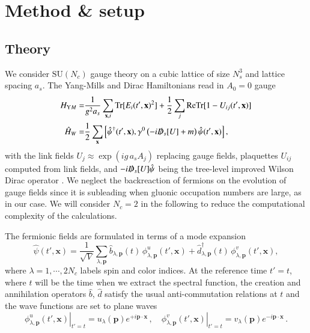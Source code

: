 \documentclass[]{webofc}
\def\be{\begin{equation}}
\def\ee{\end{equation}}
\newcommand{\SU}{\mrm{SU}}
\newcommand{\mbf}{\mathbf}
\newcommand{\tpert}{t}
\newcommand{\mrm}{\mathrm}
\newcommand{\non}{\nonumber \\}
\begin{document}


\section{Method \& setup}
\label{sec:method}


\subsection{Theory}

We consider $\SU(N_c)$ gauge theory on a cubic lattice of size $N_s^3$ and lattice spacing $a_s$. The Yang-Mills and Dirac Hamiltonians read in $A_0=0$ gauge
\begin{align}
 H_{\text YM} =& \frac{1}{g^2 a_s}\sum_{\mbf x,i}  \text{Tr}[E_{i}(t',\mbf x)^2] + \frac{1}{2}\sum_{j} \text{ReTr}[1-U_{ij}(t',\mbf x)] \non
 \hat{H}_W =& \frac{1}{2} \sum_{\mbf x} \left[ \hat{\psi}^\dagger(t',\mbf x), \gamma^0 \left( -i\slashed{D}_s[U] + m \right) \hat{\psi}(t',\mbf x) \right],
\end{align}
with the link fields $U_j \approx \exp\left( ig\, a_s A_j \right)$ replacing gauge fields, plaquettes $U_{ij}$ computed from link fields, and $-i\slashed{D}_s[U] \hat{\psi}$ being the tree-level improved Wilson Dirac operator \cite{Mace:2016shq,Mace:2019cqo}. We neglect the backreaction of fermions on the evolution of gauge fields since it is subleading when gluonic occupation numbers are large, as in our case. 
We will consider $N_c=2$ in the following to reduce the computational complexity of the calculations.

The fermionic fields are formulated in terms of a mode expansion \cite{Aarts:1998td}
\be
 \label{eq:mode_exp}
 \hat{\psi}(t',\mbf x) = \frac{1}{\sqrt{V}} \sum_{\lambda,\mbf p} \hat{b}_{\lambda,\mbf p}(\tpert)\,  \phi_{\lambda,\mbf p}^{u}(t',\mbf x) +  \hat{d}^{\dagger}_{\lambda,\mbf p}(\tpert)\,  \phi_{\lambda,\mbf p}^{v}(t',\mbf x),
\ee
where $\lambda=1,\cdots,2N_c$ labels spin and color indices. At the reference time $t' = \tpert$, where $\tpert$ will be the time when we extract the spectral function, the creation and annihilation operators $\hat{b}$, $\hat{d}$ satisfy the usual anti-commutation relations at $t$ and the wave functions are set to plane waves 
\be
 \label{eq:plane_waves}
 \left.\phi_{\lambda,\mbf p}^{u}(t',\mbf x)\right|_{t'{=}\tpert} = u_{\lambda}(\mbf p)e^{+ i \mbf p \cdot \mbf x}\,, \quad
 \left.\phi_{\lambda,\mbf p}^{v}(t',\mbf x)\right|_{t'{=}\tpert} = v_{\lambda}(\mbf p)e^{-i \mbf p \cdot \mbf x}\,.
\ee
\end{document}
